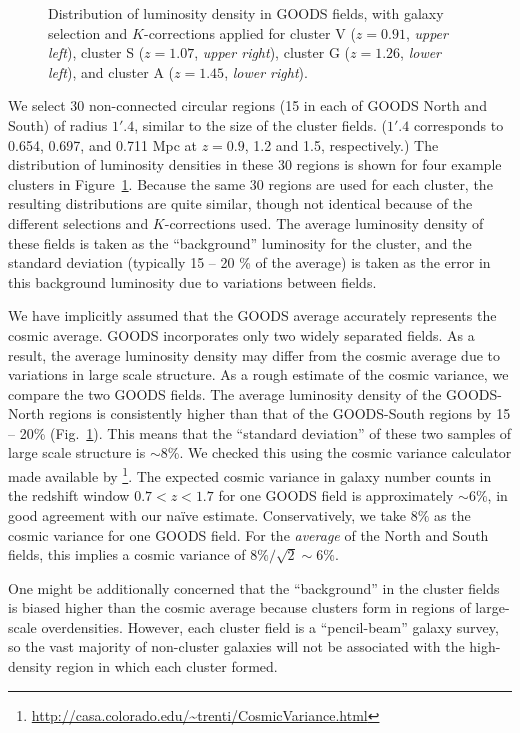 \begin{figure}[p]
\caption[Distribution of luminosity density in GOODS
fields.]{Distribution of luminosity density in GOODS fields, with
galaxy selection and $K$-corrections applied for cluster V ($z=0.91$,
\emph{upper left}), cluster S ($z=1.07$, \emph{upper right}), cluster G 
($z=1.26$, \emph{lower left}), and cluster A ($z=1.45$, \emph{lower
right}). \label{fig:bkghist_all}}
\end{figure}

We select 30 non-connected circular regions (15 in each of GOODS North
and South) of radius $1'.4$, similar to the size of the cluster
fields.  ($1'.4$ corresponds to 0.654, 0.697, and 0.711 Mpc at
$z=0.9$, 1.2 and 1.5, respectively.)  The distribution of luminosity
densities in these 30 regions is shown for four example clusters in
Figure~\ref{fig:bkghist_all}. Because the same 30 regions are used for
each cluster, the resulting distributions are quite similar, though
not identical because of the different selections and $K$-corrections
used.  The average luminosity density of these fields is taken as the
``background'' luminosity for the cluster, and the standard deviation
(typically 15 -- 20 \% of the average) is taken as the error in this
background luminosity due to variations between fields.

We have implicitly assumed that the GOODS average accurately
represents the cosmic average. GOODS incorporates only two widely
separated fields. As a result, the average luminosity density may
differ from the cosmic average due to variations in large scale
structure. As a rough estimate of the cosmic variance, we compare the
two GOODS fields.  The average luminosity density of the GOODS-North
regions is consistently higher than that of the GOODS-South regions by
15 -- 20\% (Fig.~\ref{fig:bkghist_all}). This means that the ``standard deviation'' of these two
samples of large scale structure is $\sim$8\%. We checked this using
the cosmic variance calculator made available
by \citet{trenti08a}\footnote{\url{http://casa.colorado.edu/~trenti/CosmicVariance.html}}. The
expected cosmic variance in galaxy number counts in the redshift
window $0.7 < z < 1.7$ for one GOODS field is approximately $\sim$6\%,
in good agreement with our na\"ive estimate. Conservatively, we take
$8\%$ as the cosmic variance for one GOODS field. For
the \emph{average} of the North and South fields, this implies a
cosmic variance of $8\%/\sqrt{2} \sim 6\%$.

One might be additionally concerned that the ``background'' in the
cluster fields is biased higher than the cosmic average because
clusters form in regions of large-scale overdensities. However, each
cluster field is a ``pencil-beam'' galaxy survey, so the vast majority
of non-cluster galaxies will not be associated with the high-density
region in which each cluster formed.
